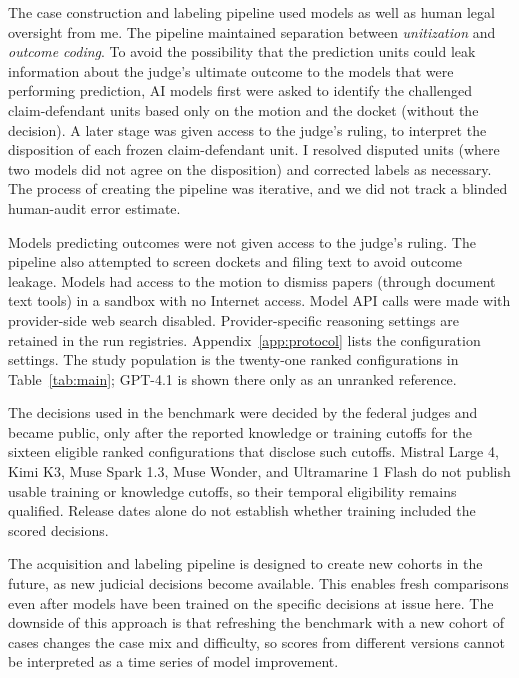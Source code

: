 \documentclass[11pt]{article}
\begin{document}
The case construction and labeling pipeline used models as well as human legal oversight from me. The pipeline maintained separation between \emph{unitization} and \emph{outcome coding}. To avoid the possibility that the prediction units could leak information about the judge's ultimate outcome to the models that were performing prediction, AI models first were asked to identify the challenged claim-defendant units based only on the motion and the docket (without the decision). A later stage was given access to the judge's ruling, to interpret the disposition of each frozen claim-defendant unit. I resolved disputed units (where two models did not agree on the disposition) and corrected labels as necessary. The process of creating the pipeline was iterative, and we did not track a blinded human-audit error estimate.

Models predicting outcomes were not given access to the judge's ruling. The pipeline also attempted to screen dockets and filing text to avoid outcome leakage. Models had access to the motion to dismiss papers (through document text tools) in a sandbox with no Internet access. Model API calls were made with provider-side web search disabled. Provider-specific reasoning settings are retained in the run registries. Appendix~\ref{app:protocol} lists the configuration settings. The study population is the twenty-one ranked configurations in Table~\ref{tab:main}; GPT-4.1 is shown there only as an unranked reference.

The decisions used in the benchmark were decided by the federal judges and became public, only after the reported knowledge or training cutoffs for the sixteen eligible ranked configurations that disclose such cutoffs. Mistral Large 4, Kimi K3, Muse Spark 1.3, Muse Wonder, and Ultramarine 1 Flash do not publish usable training or knowledge cutoffs, so their temporal eligibility remains qualified. Release dates alone do not establish whether training included the scored decisions.

The acquisition and labeling pipeline is designed to create new cohorts in the future, as new judicial decisions become available. This enables fresh comparisons even after models have been trained on the specific decisions at issue here. The downside of this approach is that refreshing the benchmark with a new cohort of cases changes the case mix and difficulty, so scores from different versions cannot be interpreted as a time series of model improvement.
\end{document}
